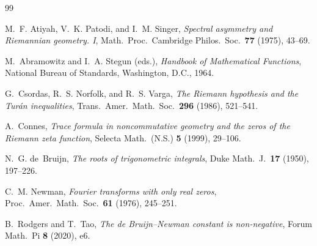 \documentclass[11pt]{amsart}
\begin{document}
\begin{thebibliography}{99}

M.~F. Atiyah, V.~K. Patodi, and I.~M. Singer,
\textit{Spectral asymmetry and Riemannian geometry. I},
Math.\ Proc.\ Cambridge Philos.\ Soc.\ \textbf{77} (1975), 43--69.

M.~Abramowitz and I.~A. Stegun (eds.),
\textit{Handbook of Mathematical Functions},
National Bureau of Standards, Washington, D.C., 1964.

G.~Csordas, R.~S. Norfolk, and R.~S. Varga,
\textit{The Riemann hypothesis and the Turán inequalities},
Trans.\ Amer.\ Math.\ Soc.\ \textbf{296} (1986), 521--541.

A.~Connes,
\textit{Trace formula in noncommutative geometry and the zeros of the Riemann
  zeta function},
Selecta Math.\ (N.S.) \textbf{5} (1999), 29--106.

N.~G. de~Bruijn,
\textit{The roots of trigonometric integrals},
Duke Math.\ J.\ \textbf{17} (1950), 197--226.

C.~M. Newman,
\textit{Fourier transforms with only real zeros},
Proc.\ Amer.\ Math.\ Soc.\ \textbf{61} (1976), 245--251.

B.~Rodgers and T.~Tao,
\textit{The de Bruijn--Newman constant is non-negative},
Forum Math.\ Pi \textbf{8} (2020), e6.

\end{thebibliography}
\end{document}
